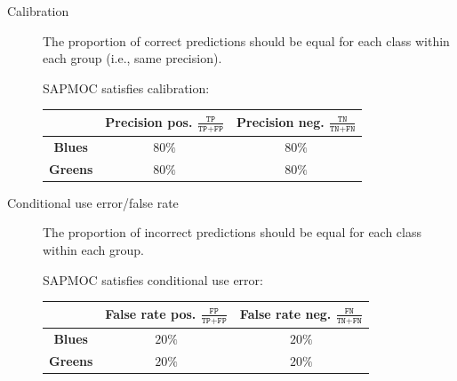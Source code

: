 \begin{description}
\begin{description}
            \item[Calibration] 
                The proportion of correct predictions should be equal for each class within each group (i.e., same precision).
                \begin{example}[SAPMOC]
                    SAPMOC satisfies calibration:
                    \begin{center}
                        \footnotesize
                        \begin{tabular}{c|cc}
                            \toprule
                                & \textbf{Precision pos.} $\frac{\texttt{TP}}{\texttt{TP}+\texttt{FP}}$ 
                                & \textbf{Precision neg.} $\frac{\texttt{TN}}{\texttt{TN}+\texttt{FN}}$ \\
                            \midrule
                                \textbf{Blues} & $80\%$ & $80\%$ \\
                                \textbf{Greens} & $80\%$ & $80\%$ \\
                            \bottomrule
                        \end{tabular}
                    \end{center}
                \end{example}

            \item[Conditional use error/false rate] 
                The proportion of incorrect predictions should be equal for each class within each group.
                \begin{example}[SAPMOC]
                    SAPMOC satisfies conditional use error:
                    \begin{center}
                        \footnotesize
                        \begin{tabular}{c|cc}
                            \toprule
                                & \textbf{False rate pos.} $\frac{\texttt{FP}}{\texttt{TP}+\texttt{FP}}$ 
                                & \textbf{False rate neg.} $\frac{\texttt{FN}}{\texttt{TN}+\texttt{FN}}$ \\
                            \midrule
                                \textbf{Blues} & $20\%$ & $20\%$ \\
                                \textbf{Greens} & $20\%$ & $20\%$ \\
                            \bottomrule
                        \end{tabular}
                    \end{center}
                \end{example}


\end{description}
\end{description}
